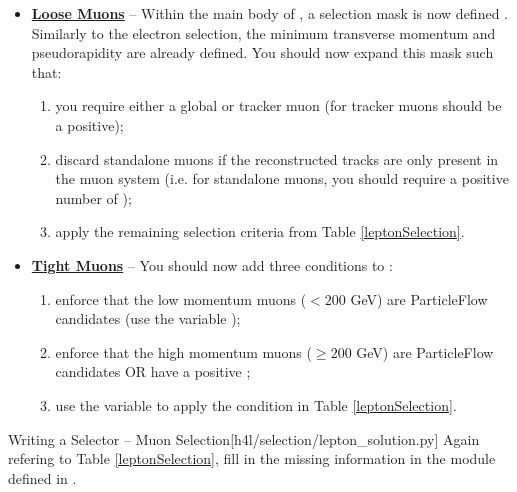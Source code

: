 \begin{itemize}
    \item {
        \textbf{\underline{Loose Muons}} -- Within the main body of , a selection mask is now defined .
        Similarly to the electron selection, the minimum transverse momentum and pseudorapidity are already defined.
        You should now expand this mask such that:
        \begin{enumerate}
            \item you require either a global or tracker muon (for tracker muons  should be a positive);
            \item discard standalone muons if the reconstructed tracks are only present in the muon system (i.e. for standalone muons, you should require a positive number of );
            \item apply the remaining selection criteria from Table \ref{leptonSelection}.
        \end{enumerate}
    }
    \item {
        \textbf{\underline{Tight Muons}} -- You should now add three conditions to :
        \begin{enumerate}
            \item enforce that the low momentum muons ($< 200$ GeV) are ParticleFlow candidates (use the variable );
            \item enforce that the high momentum muons ($\geq 200$ GeV) are ParticleFlow candidates OR have a positive ;
            \item use the variable  to apply the condition in Table \ref{leptonSelection}.
        \end{enumerate}
    }
\end{itemize}

\begin{exercise}{Writing a Selector -- Muon Selection}[h4l/selection/lepton\_solution.py]
	Again refering to Table \ref{leptonSelection}, fill in the missing information in the  module  defined in .
\end{exercise}
